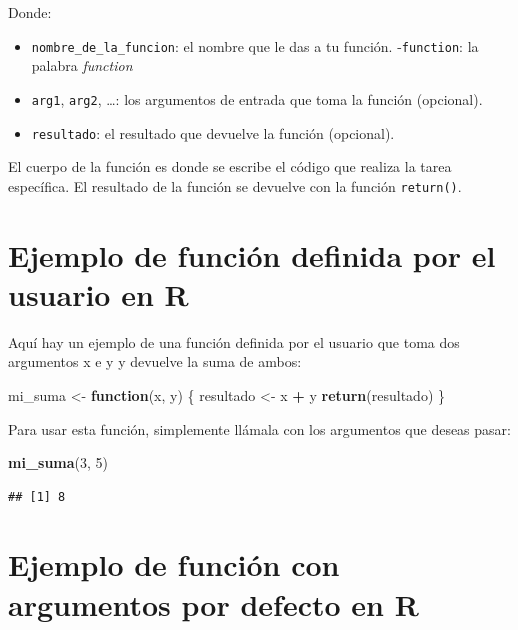 \documentclass[
]{book}
\newenvironment{Shaded}{\begin{snugshade}}{\end{snugshade}}
\newcommand{\ControlFlowTok}[1]{\textcolor[rgb]{0.13,0.29,0.53}{\textbf{#1}}}
\newcommand{\DecValTok}[1]{\textcolor[rgb]{0.00,0.00,0.81}{#1}}
\newcommand{\FunctionTok}[1]{\textcolor[rgb]{0.13,0.29,0.53}{\textbf{#1}}}
\newcommand{\NormalTok}[1]{#1}
\newcommand{\OtherTok}[1]{\textcolor[rgb]{0.56,0.35,0.01}{#1}}
\newcommand{\SpecialCharTok}[1]{\textcolor[rgb]{0.81,0.36,0.00}{\textbf{#1}}}
\providecommand{\tightlist}{%
  \setlength{\itemsep}{0pt}\setlength{\parskip}{0pt}}
\begin{document}
Donde:

\begin{itemize}
\tightlist
\item
  \texttt{nombre\_de\_la\_funcion}: el nombre que le das a tu función. -\texttt{function}: la palabra \emph{function}
\item
  \texttt{arg1}, \texttt{arg2}, \ldots: los argumentos de entrada que toma la función (opcional).
\item
  \texttt{resultado}: el resultado que devuelve la función (opcional).
\end{itemize}

El cuerpo de la función es donde se escribe el código que realiza la tarea específica. El resultado de la función se devuelve con la función \texttt{return()}.

\section{Ejemplo de función definida por el usuario en R}\label{ejemplo-de-funciuxf3n-definida-por-el-usuario-en-r}

Aquí hay un ejemplo de una función definida por el usuario que toma dos argumentos x e y y devuelve la suma de ambos:

\begin{Shaded}
\begin{Highlighting}[]
\NormalTok{mi\_suma }\OtherTok{\textless{}{-}} \ControlFlowTok{function}\NormalTok{(x, y) \{}
\NormalTok{  resultado }\OtherTok{\textless{}{-}}\NormalTok{ x }\SpecialCharTok{+}\NormalTok{ y}
  \FunctionTok{return}\NormalTok{(resultado)}
\NormalTok{\}}
\end{Highlighting}
\end{Shaded}

Para usar esta función, simplemente llámala con los argumentos que deseas pasar:

\begin{Shaded}
\begin{Highlighting}[]
\FunctionTok{mi\_suma}\NormalTok{(}\DecValTok{3}\NormalTok{, }\DecValTok{5}\NormalTok{)}
\end{Highlighting}
\end{Shaded}

\begin{verbatim}
## [1] 8
\end{verbatim}

\section{Ejemplo de función con argumentos por defecto en R}\label{ejemplo-de-funciuxf3n-con-argumentos-por-defecto-en-r}
\end{document}

